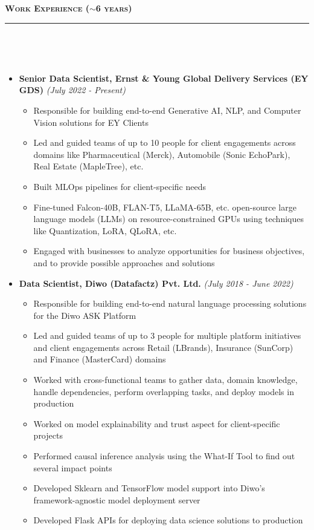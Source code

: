 \documentclass[a4paper,10pt]{article}
\newcommand{\isep}{-2 pt}
\newcommand{\lsep}{-0.5cm}
\newcommand{\resheading}[1]{{\small
        {
            \begin{minipage}
                {0.992\textwidth}\textbf{{\textsc{#1 \vphantom{p\^{E}} }}}
                \\[-0.3cm]
                \hrule
            \end{minipage}
            \\[-0.5cm]
        }
 }}
\begin{document}
\noindent
\resheading{\textbf{\large Work Experience ($\sim$6 years)}}\\[\lsep]
\begin{itemize}

    \item \textbf{Senior Data Scientist, Ernst \& Young Global Delivery Services (EY GDS)} \hfill {\emph{(July 2022 - Present)}}
    \\ [-0.6cm]
    \begin{itemize}\itemsep \isep
        \item Responsible for building end-to-end Generative AI, NLP, and Computer Vision solutions for EY Clients
        \item Led and guided teams of up to 10 people for client engagements across domains like Pharmaceutical (Merck), Automobile (Sonic EchoPark), Real Estate (MapleTree), etc.
        \item Built MLOps pipelines for client-specific needs
        \item Fine-tuned Falcon-40B, FLAN-T5, LLaMA-65B, etc. open-source large language models (LLMs) on resource-constrained GPUs using techniques like Quantization, LoRA, QLoRA, etc.
        \item Engaged with businesses to analyze opportunities for business objectives, and to provide possible approaches and solutions
    \\ [-0.5cm]
    \end{itemize}
    
    \item \textbf{Data Scientist, Diwo (Datafactz) Pvt. Ltd.} \hfill {\emph{(July 2018 - June 2022)}}
    \\ [-0.6cm]
    \begin{itemize}\itemsep \isep
        \item Responsible for building end-to-end natural language processing solutions for the Diwo ASK Platform
        \item Led and guided teams of up to 3 people for multiple platform initiatives and client engagements across Retail (LBrands), Insurance (SunCorp) and Finance (MasterCard) domains
        \item Worked with cross-functional teams to gather data, domain knowledge, handle dependencies, perform overlapping tasks, and deploy models in production  
        \item Worked on model explainability and trust aspect for client-specific projects
        \item Performed causal inference analysis using the What-If Tool to find out several impact points
        \item Developed Sklearn and TensorFlow model support into Diwo's framework-agnostic model deployment server
        \item Developed Flask APIs for deploying data science solutions to production
    \\ [-0.5cm]
    \end{itemize}
    

\end{itemize}
\end{document}
